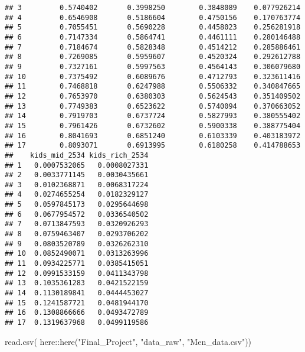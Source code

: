 \documentclass[
]{article}
\newenvironment{Shaded}{\begin{snugshade}}{\end{snugshade}}
\newcommand{\FunctionTok}[1]{\textcolor[rgb]{0.00,0.00,0.00}{#1}}
\newcommand{\NormalTok}[1]{#1}
\newcommand{\SpecialCharTok}[1]{\textcolor[rgb]{0.00,0.00,0.00}{#1}}
\newcommand{\StringTok}[1]{\textcolor[rgb]{0.31,0.60,0.02}{#1}}
\begin{document}
\begin{verbatim}
## 3         0.5740402       0.3998250        0.3848089    0.077926214
## 4         0.6546908       0.5186604        0.4750156    0.170763774
## 5         0.7055451       0.5690228        0.4458023    0.256281918
## 6         0.7147334       0.5864741        0.4461111    0.280146488
## 7         0.7184674       0.5828348        0.4514212    0.285886461
## 8         0.7269085       0.5959607        0.4520324    0.292612788
## 9         0.7327161       0.5997563        0.4564143    0.306079680
## 10        0.7375492       0.6089676        0.4712793    0.323611416
## 11        0.7468818       0.6247988        0.5506332    0.340847665
## 12        0.7653970       0.6380303        0.5624543    0.351409502
## 13        0.7749383       0.6523622        0.5740094    0.370663052
## 14        0.7919703       0.6737724        0.5827993    0.380555402
## 15        0.7961426       0.6732602        0.5900338    0.388775404
## 16        0.8041693       0.6851240        0.6103339    0.403183972
## 17        0.8093071       0.6913995        0.6180258    0.414788653
##    kids_mid_2534 kids_rich_2534
## 1   0.0007532065   0.0008027331
## 2   0.0033771145   0.0030435661
## 3   0.0102368871   0.0068317224
## 4   0.0274655254   0.0182329127
## 5   0.0597845173   0.0295644698
## 6   0.0677954572   0.0336540502
## 7   0.0713847593   0.0320926293
## 8   0.0759463407   0.0293706202
## 9   0.0803520789   0.0326262310
## 10  0.0852490071   0.0313263996
## 11  0.0934225771   0.0385415051
## 12  0.0991533159   0.0411343798
## 13  0.1035361283   0.0421522159
## 14  0.1130189841   0.0444453027
## 15  0.1241587721   0.0481944170
## 16  0.1308866666   0.0493472789
## 17  0.1319637968   0.0499119586
\end{verbatim}

\begin{Shaded}
\begin{Highlighting}[]
\FunctionTok{read.csv}\NormalTok{(}
\NormalTok{  here}\SpecialCharTok{::}\FunctionTok{here}\NormalTok{(}\StringTok{"Final\_Project"}\NormalTok{, }\StringTok{"data\_raw"}\NormalTok{, }\StringTok{"Men\_data.csv"}\NormalTok{))}
\end{Highlighting}
\end{Shaded}
\end{document}
